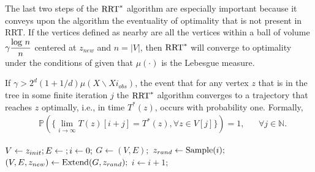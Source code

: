 The last two steps of the $\textnormal{RRT}^*$ algorithm are especially important because it conveys upon the algorithm the eventuality of optimality that is not present in RRT. If the vertices defined as nearby are all the vertices within a ball of volume $\gamma \dfrac{\textnormal{log }n}{n}$ centered at $z_{new}$ and  $n = |V|$, then $\textnormal{RRT}^*$ will converge to optimality under the conditions of  given that $\mu(\cdot)$ is the Lebesgue measure.
\begin{theorem}\label{RRTopt}
If $\gamma > 2^d(1+1/d)\mu(X \backslash Xi_{obs})$, the event that for any vertex $z$ that is in the tree in some finite iteration $j$ the $\textnormal{RRT}^*$ algorithm converges to a trajectory that reaches $z$ optimally, i.e., in time $T^*(z)$, occurs with probability one. Formally,
\begin{align*}
&\mathbb{P}(\{\lim\limits_{i \rightarrow \infty}T(z)[i+j] = T^*(z),   \forall z \in V[j]\}) = 1, && \forall j \in \mathbb{N}.
\end{align*}   
\end{theorem}

\begin{algorithm}
\caption{$\textnormal{RRT}^*$ \cite{karaman}}\label{RRTalg}
\begin{algorithmic}[1]
	\State $V \leftarrow {z_{init}}; E \leftarrow \null; i \leftarrow 0;$
	 \do{}
		\State $G \leftarrow (V,E);$
		\State $z_{rand} \leftarrow \textnormal{Sample}(i);$
		\State $(V,E,z_{new}) \leftarrow \textnormal{Extend}(G,z_{rand});$
		\State $i \leftarrow i +1;$
	\EndWhile
\end{algorithmic}
\end{algorithm} 

